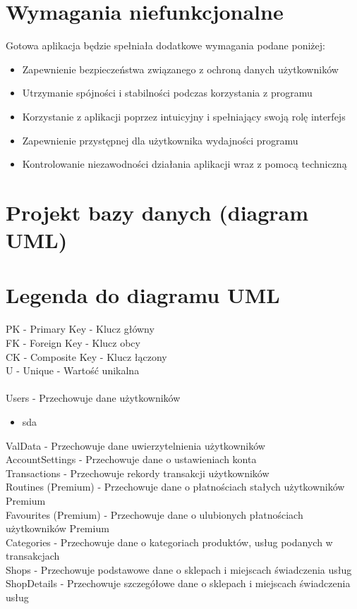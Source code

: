 \documentclass{article}
\begin{document}
    \section{Wymagania niefunkcjonalne}
    Gotowa aplikacja będzie spełniała dodatkowe wymagania podane poniżej:
    \begin{itemize}
    \item Zapewnienie bezpieczeństwa związanego z ochroną danych użytkowników
    \item Utrzymanie spójności i stabilności podczas korzystania z programu
    \item Korzystanie z aplikacji poprzez intuicyjny i spełniający swoją rolę interfejs
    \item Zapewnienie przystępnej dla użytkownika wydajności programu
    \item Kontrolowanie niezawodności działania aplikacji wraz z pomocą techniczną
    \end{itemize}
    
    \section{Projekt bazy danych (diagram UML)}
    
    \section{Legenda do diagramu UML}
    PK - Primary Key - Klucz główny
    \\FK - Foreign Key - Klucz obcy
    \\CK - Composite Key - Klucz łączony
    \\U - Unique - Wartość unikalna
    \\
    \\Users - Przechowuje dane użytkowników
    \begin{itemize}
    \item sda
    \end{itemize}
    ValData - Przechowuje dane uwierzytelnienia użytkowników
    \\AccountSettings - Przechowuje dane o ustawieniach konta
    \\Transactions - Przechowuje rekordy transakcji użytkowników
    \\Routines (Premium) - Przechowuje dane o płatnościach stałych użytkowników Premium
    \\Favourites (Premium) - Przechowuje dane o ulubionych płatnościach użytkowników Premium
    \\Categories - Przechowuje dane o kategoriach produktów, usług podanych w transakcjach
    \\Shops - Przechowuje podstawowe dane o sklepach i miejscach świadczenia usług
    \\ShopDetails - Przechowuje szczegółowe dane o sklepach i miejscach świadczenia usług
    
\end{document}
